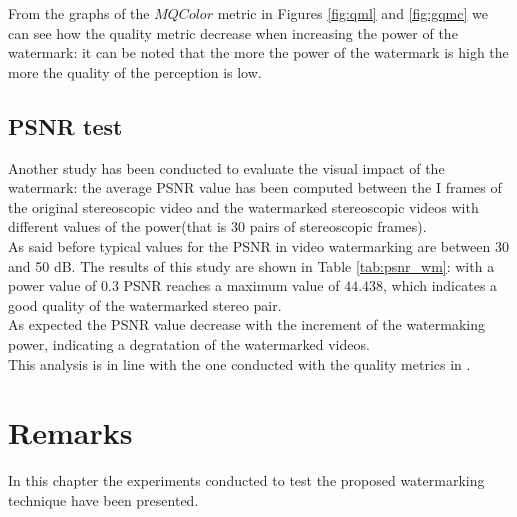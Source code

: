 From the graphs of the $MQColor$ metric in Figures \ref{fig:qml} and \ref{fig:gqmc} we can see how the quality metric decrease when increasing the power of the watermark: it can be noted that the more the power of the watermark is high the more the quality of the perception is low.

\subsection{PSNR test}

Another study has been conducted to evaluate the visual impact of the watermark: the average PSNR value has been computed between the I frames of the original stereoscopic video and the watermarked stereoscopic videos with different values of the power(that is 30 pairs of stereoscopic frames).\\
As said before typical values for the PSNR in video watermarking are between 30 and 50 dB.
The results of this study are shown in Table \ref{tab:psnr_wm}: with a power value of $0.3$ PSNR reaches a maximum value of $44.438$, which indicates a good quality of the watermarked stereo pair. \\
As expected the PSNR value decrease with the increment of the watermaking power, indicating a degratation of the watermarked videos.\\ This analysis is in line with the one conducted with the quality metrics in \cite{QMETRICS}.

\begin{table}[h!]
\begin{center}
\caption{\small{Average PSNR values between original video and watermarked videos with increasing value of the power.} \label{tab:psnr_wm}}
\end{center}
\end{table}
\clearpage
\section{Remarks}

In this chapter the experiments conducted to test the proposed watermarking technique have been presented.

